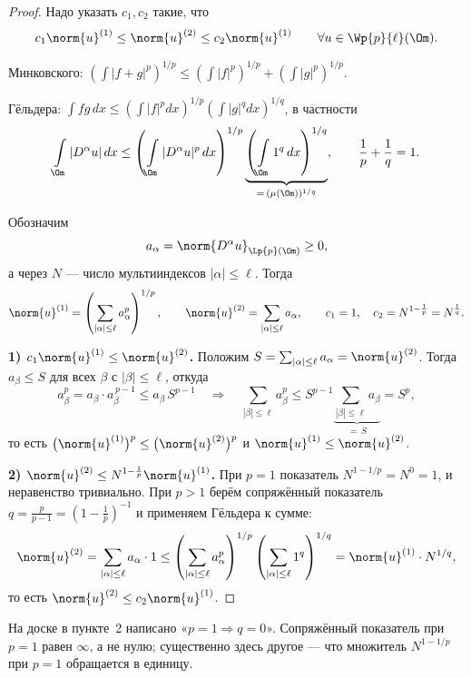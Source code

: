 \begin{proof}
Надо указать $c_1, c_2$ такие, что
\[
  c_1 \norm{u}^{(1)} \le \norm{u}^{(2)} \le c_2 \norm{u}^{(1)}
  \qquad \forall u \in \Wp{p}{\ell}(\Om) .
\]

\begin{reminder}
Минковского: $\displaystyle \left(\int |f+g|^p\right)^{1/p}
\le \left(\int |f|^p\right)^{1/p} + \left(\int |g|^p\right)^{1/p}$.

\smallskip
Гёльдера: $\displaystyle \int fg\, dx
\le \left(\int |f|^p dx\right)^{1/p} \left(\int |g|^q dx\right)^{1/q}$, в частности
\[
  \int\limits_\Om |D^\alpha u|\, dx
  \le \left( \int\limits_\Om |D^\alpha u|^p\, dx \right)^{1/p}
      \underbrace{\left( \int\limits_\Om 1^q\, dx \right)^{1/q}}_{=\,(\mu(\Om))^{1/q}},
  \qquad \frac1p + \frac1q = 1 .
\]
\end{reminder}

Обозначим
\[
  a_\alpha = \norm{D^\alpha u}_{\Lp{p}(\Om)} \ge 0 ,
\]
а через $N$ — число мультииндексов $|\alpha| \le \ell$. Тогда
\[
  \norm{u}^{(1)} = \left( \sum_{|\alpha| \le \ell} a_\alpha^p \right)^{1/p},
  \qquad
  \norm{u}^{(2)} = \sum_{|\alpha| \le \ell} a_\alpha ,
  \qquad c_1 = 1, \quad c_2 = N^{1 - \frac1p} = N^{\frac1q} .
\]

\textbf{1) $c_1 \norm{u}^{(1)} \le \norm{u}^{(2)}$.} Положим
$S = \sum_{|\alpha| \le \ell} a_\alpha = \norm{u}^{(2)}$. Тогда $a_\beta \le S$ для
всех $\beta$ с $|\beta| \le \ell$, откуда
\[
  a_\beta^p = a_\beta \cdot a_\beta^{\,p-1} \le a_\beta\, S^{p-1}
  \quad\Longrightarrow\quad
  \sum_{|\beta| \le \ell} a_\beta^p \le S^{p-1} \underbrace{\sum_{|\beta| \le \ell} a_\beta}_{=\,S} = S^p ,
\]
то есть $\big(\norm{u}^{(1)}\big)^p \le \big(\norm{u}^{(2)}\big)^p$ и
$\norm{u}^{(1)} \le \norm{u}^{(2)}$.

\textbf{2) $\norm{u}^{(2)} \le N^{1-\frac1p} \norm{u}^{(1)}$.}
При $p = 1$ показатель $N^{1-1/p} = N^0 = 1$, и неравенство тривиально. При $p > 1$
берём сопряжённый показатель $q = \frac{p}{p-1} = \left(1 - \frac1p\right)^{-1}$
и применяем Гёльдера к сумме:
\[
  \norm{u}^{(2)} = \sum_{|\alpha| \le \ell} a_\alpha \cdot 1
  \le \left( \sum_{|\alpha| \le \ell} a_\alpha^p \right)^{1/p}
      \left( \sum_{|\alpha| \le \ell} 1^q \right)^{1/q}
  = \norm{u}^{(1)} \cdot N^{1/q} ,
\]
то есть $\norm{u}^{(2)} \le c_2 \norm{u}^{(1)}$.
\end{proof}

\begin{warn}
На доске в пункте~2 написано «$p = 1 \Rightarrow q = 0$». Сопряжённый показатель при
$p=1$ равен $\infty$, а не нулю; существенно здесь другое — что множитель
$N^{1-1/p}$ при $p=1$ обращается в единицу.
\end{warn}

